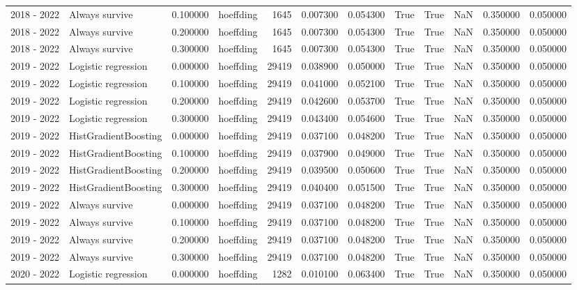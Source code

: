 \begin{tabular}{llrlrrrrrrrr}
2018 - 2022 & Always survive & 0.100000 & hoeffding & 1645 & 0.007300 & 0.054300 & True & True & NaN & 0.350000 & 0.050000 \\
2018 - 2022 & Always survive & 0.200000 & hoeffding & 1645 & 0.007300 & 0.054300 & True & True & NaN & 0.350000 & 0.050000 \\
2018 - 2022 & Always survive & 0.300000 & hoeffding & 1645 & 0.007300 & 0.054300 & True & True & NaN & 0.350000 & 0.050000 \\
2019 - 2022 & Logistic regression & 0.000000 & hoeffding & 29419 & 0.038900 & 0.050000 & True & True & NaN & 0.350000 & 0.050000 \\
2019 - 2022 & Logistic regression & 0.100000 & hoeffding & 29419 & 0.041000 & 0.052100 & True & True & NaN & 0.350000 & 0.050000 \\
2019 - 2022 & Logistic regression & 0.200000 & hoeffding & 29419 & 0.042600 & 0.053700 & True & True & NaN & 0.350000 & 0.050000 \\
2019 - 2022 & Logistic regression & 0.300000 & hoeffding & 29419 & 0.043400 & 0.054600 & True & True & NaN & 0.350000 & 0.050000 \\
2019 - 2022 & HistGradientBoosting & 0.000000 & hoeffding & 29419 & 0.037100 & 0.048200 & True & True & NaN & 0.350000 & 0.050000 \\
2019 - 2022 & HistGradientBoosting & 0.100000 & hoeffding & 29419 & 0.037900 & 0.049000 & True & True & NaN & 0.350000 & 0.050000 \\
2019 - 2022 & HistGradientBoosting & 0.200000 & hoeffding & 29419 & 0.039500 & 0.050600 & True & True & NaN & 0.350000 & 0.050000 \\
2019 - 2022 & HistGradientBoosting & 0.300000 & hoeffding & 29419 & 0.040400 & 0.051500 & True & True & NaN & 0.350000 & 0.050000 \\
2019 - 2022 & Always survive & 0.000000 & hoeffding & 29419 & 0.037100 & 0.048200 & True & True & NaN & 0.350000 & 0.050000 \\
2019 - 2022 & Always survive & 0.100000 & hoeffding & 29419 & 0.037100 & 0.048200 & True & True & NaN & 0.350000 & 0.050000 \\
2019 - 2022 & Always survive & 0.200000 & hoeffding & 29419 & 0.037100 & 0.048200 & True & True & NaN & 0.350000 & 0.050000 \\
2019 - 2022 & Always survive & 0.300000 & hoeffding & 29419 & 0.037100 & 0.048200 & True & True & NaN & 0.350000 & 0.050000 \\
2020 - 2022 & Logistic regression & 0.000000 & hoeffding & 1282 & 0.010100 & 0.063400 & True & True & NaN & 0.350000 & 0.050000 \\

\end{tabular}
